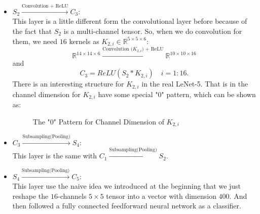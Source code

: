 \begin{itemize}
\item $S_2 \xrightarrow{\text{Convolution + ReLU}} C_3$:\\
This layer is a little different form the convolutional layer before because of the fact that $S_2$ is a multi-channel tensor.  So, when we do convolution for them, we need $16$ kernels as $K_{2,i} \in \mathbb{R}^{5 \times 5 \times 6}$:  
\begin{equation}
\mathbb{R}^{14\times 14 \times 6}  \xrightarrow{\text{Convolution ($K_{2,i}$) + ReLU}} \mathbb{R}^{10\times 10 \times 16} 
\end{equation}
and
\begin{equation}
C_3 = ReLU(S_2\ast K_{2,i}) \quad i = 1:16.
\end{equation}
There is an interesting structure for $K_{2,i}$ in the real LeNet-5. That is in the channel dimension for $K_{2,i}$ have some special "0" pattern, which can be shown as:
\begin{figure}[!htb]\label{LeNet-Channel}
	\caption{The "0" Pattern for Channel Dimension of $K_{2,i}$}      
\end{figure}

\item $C_3 \xrightarrow{\text{Subsampling(Pooling)}} S_4$:  \\
This layer is the same with $C_1 \xrightarrow{\text{Subsampling(Pooling)}} S_2$. 

\item $S_4 \xrightarrow{\text{Subsampling(Pooling)}} C_5$:  \\
This layer use the naive idea we introduced at the beginning that we just reshape the $16$-channels $5\times 5$ tensor into a vector with dimension $400$. And then followed a fully connected feedforward neural network as a classifier.
\end{itemize}



